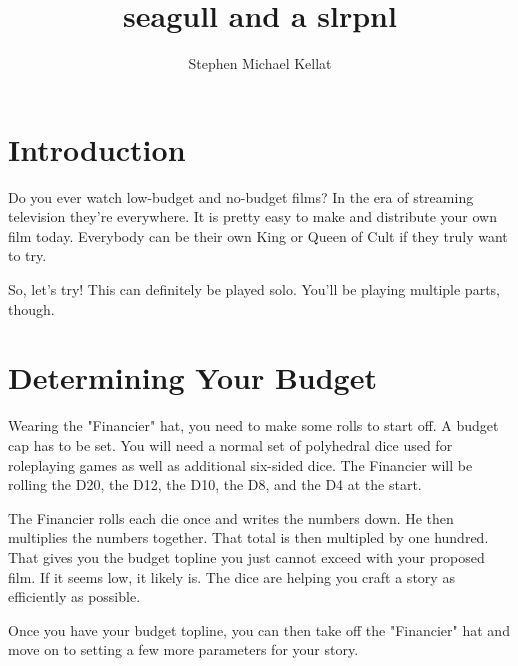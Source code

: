 \documentclass[
notumble,
a5paper
]{leaflet}
\title{seagull and a slrpnl}
\author{Stephen Michael Kellat}
\date{}
\begin{document}
\maketitle

\maketitle

\begin{center}
\begin{Large}    \end{Large}
\end{center}

\section*{Introduction}

Do you ever watch low-budget and no-budget films?  In the era of streaming television they're everywhere.  It is pretty easy to make and distribute your own film today.  Everybody can be their own King or Queen of Cult if they truly want to try.

So, let's try!  This can definitely be played solo.  You'll be playing multiple parts, though.
\cleardoublepage
\section*{Determining Your Budget}

Wearing the "Financier" hat, you need to make some rolls to start off.  A budget cap has to be set.  You will need a normal set of polyhedral dice used for roleplaying games as well as additional six-sided dice.  The Financier will be rolling the D20, the D12, the D10, the D8, and the D4 at the start.

The Financier rolls each die once and writes the numbers down.  He then multiplies the numbers together.  That total is then multipled by one hundred.  That gives you the budget topline you just cannot exceed with your proposed film.  If it seems low, it likely is.  The dice are helping you craft a story as efficiently as possible.

Once you have your budget topline, you can then take off the "Financier" hat and move on to setting a few more parameters for your story.

\begin{center}
\begin{Large} \faMoneyBill* \faMoneyBillWave \faMoneyCheck* \end{Large}
\end{center}
\cleardoublepage
\end{document}
